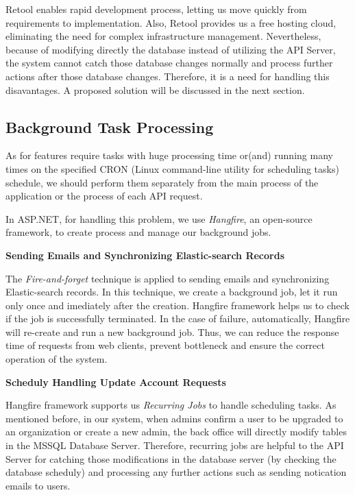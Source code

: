 Retool enables rapid development process, letting us move quickly from requirements to implementation. Also, Retool provides us a free hosting cloud, eliminating the need for complex infrastructure
management. Nevertheless, because of modifying directly the database instead of utilizing the API Server, the system cannot
catch those database changes normally and process further actions after those database changes. Therefore, it is a need for handling this disavantages.
A proposed solution will be discussed in the next section.

\subsection{Background Task Processing}
As for features require tasks with huge processing time or(and) running many times on the specified CRON (Linux command-line utility for scheduling tasks) schedule,
we should perform them separately from the main process of the application or the process of each API request.

In ASP.NET, for handling this problem, we use \textit{Hangfire}, an open-source framework, to create process and manage our background jobs.

\textbf{Sending Emails and Synchronizing Elastic-search Records}

The \textit{Fire-and-forget} technique is applied to sending emails and synchronizing Elastic-search records.
In this technique, we create a background job, let it run only once and imediately after the creation.
Hangfire framework helps us to check if the job is successfully terminated. In the case of failure, automatically, Hangfire will re-create and
run a new background job. Thus, we can reduce the response time of requests from web clients, prevent bottleneck and ensure the correct operation of the system.

\textbf{Scheduly Handling Update Account Requests}

Hangfire framework supports us \textit{Recurring Jobs} to handle scheduling tasks.
As mentioned before, in our system, when admins confirm a user to be upgraded to an organization or create a new admin,
the back office will directly modify tables in the MSSQL Database Server.
Therefore, recurring jobs are helpful to the API Server for catching those modifications in the database server
(by checking the database scheduly) and processing any further actions such as sending notication emails to
users.